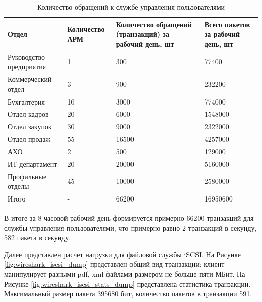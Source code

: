 \documentclass[14pt, a4paper]{extarticle}
\numberwithin{equation}{section}
\begin{document}
\begin{table}[H]
\centering
\small
\caption{Количество обращений к службе управления пользователями}
\label{table:freeipa_requests}
\begin{tabular}{|m{3cm}|m{3cm}|m{4cm}|m{3cm}|}
\hline
\textbf{Отдел} & \textbf{Количество АРМ} & \textbf{Количество обращений (транзакций) за рабочий день, шт } & \textbf{Всего пакетов за рабочий день, шт }\\
\hline
Руководство предприятия & 1 & 300 & 77400 \\
\hline
Коммерческий отдел & 3 & 900 & 232200 \\
\hline
Бухгалтерия & 10 & 3000 & 774000\\
\hline
Отдел кадров & 20 & 6000 & 1548000 \\
\hline
Отдел закупок & 30 & 9000 & 2322000\\
\hline
Отдел продаж & 55 & 16500 & 4257000 \\
\hline
АХО & 2 & 500 & 129000 \\
\hline
ИТ-департамент & 20 & 20000 & 5160000 \\
\hline
Профильные отделы & 45 & 10000 & 2580000 \\
\hline
Итого & - & 66200 & 16950600  \\
\hline
\end{tabular}
\end{table}

В итоге за 8-часовой рабочий день формируется примерно 66200 транзакций для 
службы управления пользователями, что примерно равно 
2 транзакций в секунду,  582 пакета в секунду.

Далее представлен расчет нагрузки для файловой службы iSCSI. На Рисунке \ref{fig:wireshark_iscsi_dump} 
представлен общий вид транзакции: клиент манипулирует разными pdf, xml
файлами размером не больше пяти МБит.
На Рисунке \ref{fig:wireshark_iscsi_stats_dump} представлена статистика транзакции. Максимальный размер пакета 395680 бит,
количество пакетов в транзакции 591.
\end{document}
